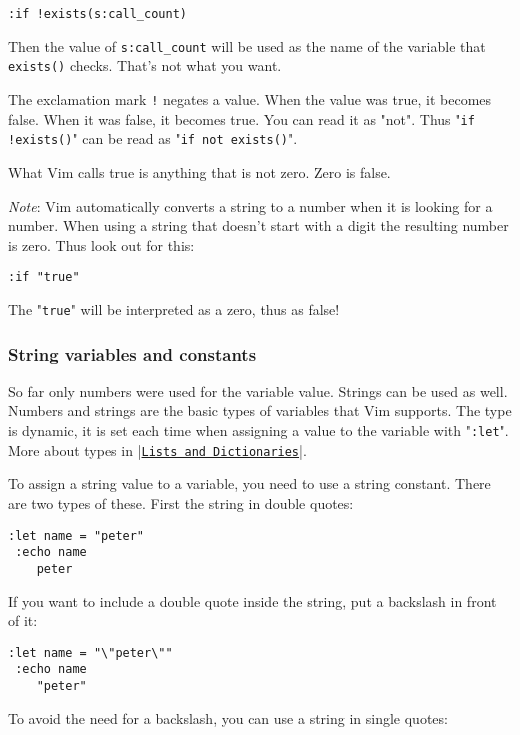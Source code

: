 \begin{Verbatim}[samepage=true]
 :if !exists(s:call_count)
\end{Verbatim}

Then the value of \verb!s:call_count! will be used as the name of the variable that \verb!exists()! checks.
That's not what you want.

The exclamation mark \verb;!; negates a value.
When the value was true, it becomes false.
When it was false, it becomes true.
You can read it as "not".
Thus "\verb;if !exists();" can be read as "\verb!if not exists()!".

What Vim calls true is anything that is not zero.
Zero is false.

\emph{Note}:
Vim automatically converts a string to a number when it is looking for a number.
When using a string that doesn't start with a digit the resulting number is zero.
Thus look out for this:

\begin{Verbatim}[samepage=true]
  :if "true"
\end{Verbatim}

The "\verb!true!" will be interpreted as a zero, thus as false!
\subsubsection{String variables and constants}
So far only numbers were used for the variable value.
Strings can be used as well.
Numbers and strings are the basic types of variables that Vim supports.
The type is dynamic, it is set each time when assigning a value to the variable with "\verb!:let!".
More about types in |\hyperref[Lists and Dictionaries]{\texttt{Lists and Dictionaries}}|.

To assign a string value to a variable, you need to use a string constant.
There are two types of these.
First the string in double quotes:

\begin{Verbatim}[samepage=true]
 :let name = "peter"
 :echo name
    peter
\end{Verbatim}

If you want to include a double quote inside the string, put a backslash in front of it:

\begin{Verbatim}[samepage=true]
 :let name = "\"peter\""
 :echo name
    "peter"
\end{Verbatim}

To avoid the need for a backslash, you can use a string in single quotes:

